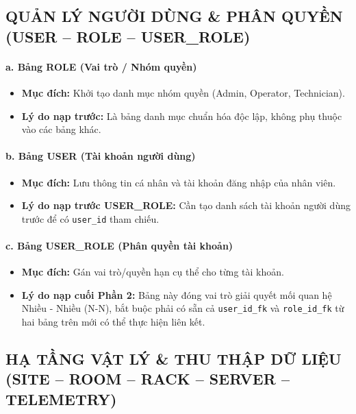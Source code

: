 \subsection{QUẢN LÝ NGƯỜI DÙNG \& PHÂN QUYỀN (USER -- ROLE -- USER\_ROLE)}

\paragraph{a. Bảng ROLE (Vai trò / Nhóm quyền)}
\begin{itemize}
    \item \textbf{Mục đích:} Khởi tạo danh mục nhóm quyền (Admin, Operator, Technician).
    \item \textbf{Lý do nạp trước:} Là bảng danh mục chuẩn hóa độc lập, không phụ thuộc vào các bảng khác.
\end{itemize}

\paragraph{b. Bảng USER (Tài khoản người dùng)}
\begin{itemize}
    \item \textbf{Mục đích:} Lưu thông tin cá nhân và tài khoản đăng nhập của nhân viên.
    \item \textbf{Lý do nạp trước USER\_ROLE:} Cần tạo danh sách tài khoản người dùng trước để có \texttt{user\_id} tham chiếu.
\end{itemize}

\paragraph{c. Bảng USER\_ROLE (Phân quyền tài khoản)}
\begin{itemize}
    \item \textbf{Mục đích:} Gán vai trò/quyền hạn cụ thể cho từng tài khoản.
    \item \textbf{Lý do nạp cuối Phần 2:} Bảng này đóng vai trò giải quyết mối quan hệ Nhiều - Nhiều (N-N), bắt buộc phải có sẵn cả \texttt{user\_id\_fk} và \texttt{role\_id\_fk} từ hai bảng trên mới có thể thực hiện liên kết.
\end{itemize}

\subsection{HẠ TẦNG VẬT LÝ \& THU THẬP DỮ LIỆU (SITE -- ROOM -- RACK -- SERVER -- TELEMETRY)}

